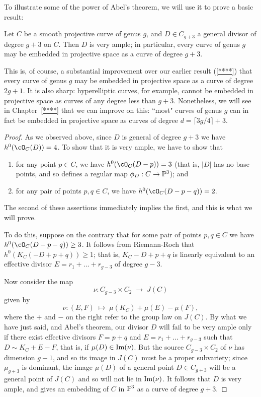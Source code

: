 To illustrate some of the power of Abel's theorem, we will use it to prove a basic result:

\begin{theorem}\label{g+3 theorem}
Let $C$ be a smooth projective curve of genus $g$, and $D \in C_{g+3}$ a general divisor of degree $g+3$ on $C$. Then $D$ is very ample; in particular, every curve of genus $g$ may be embedded in projective space as a curve of degree $g+3$.
\end{theorem}

This is, of course, a substantial improvement over our earlier result (\ref{****}) that every curve of genus $g$ may be embedded in projective space as a curve of degree $2g+1$. It is also sharp: hyperelliptic curves, for example, cannot be embedded in projective space as curves of any degree less than $g+3$. Nonetheless, we will see in Chapter~\ref{****} that we can improve on this: ``most" curves of genus $g$ can in fact be embedded in projective space as curves of degree $d = \lceil 3g/4 \rceil + 3$.

\begin{proof}
As we observed above, since $D$ is general of degree $g+3$ we have $h^0(\cO_C(D)) = 4$. To show that it is very ample, we have to show that
\begin{enumerate}
\item for any point $p \in C$, we have $h^0(\cO_C(D-p)) = 3$ (that is, $|D|$ has no base points, and so defines a regular map $\phi_D : C \to \PP^3$); and
\item for any pair of points $p, q \in C$, we have $h^0(\cO_C(D-p-q)) = 2$.
\end{enumerate}
The second of these assertions immediately implies the first, and this is what we will prove.

To do this, suppose on the contrary that for some pair of points $p, q \in C$ we have $h^0(\cO_C(D-p-q)) \geq 3$. It follows from Riemann-Roch that $h^0(K_C(-D + p + q)) \geq 1$; that is, $K_C -D + p + q$ is linearly equivalent to an effective divisor $E = r_1 + \dots + r_{g-3}$ of degree $g-3$.

Now consider the map
$$
\nu : C_{g-3} \times C_2 \; \to \; J(C)
$$
given by
$$
\nu : (E,F) \; \mapsto \; \mu(K_C) + \mu(E) - \mu(F),
$$
where the $+$ and $-$ on the right refer to the group law on $J(C)$. By what we have just said, and Abel's theorem, our divisor $D$ will fail to be very ample only if there exist effective divisors $F = p+q$ and $E = r_1+\dots+r_{g-3}$ such that $D \sim K_C +E-F$, that is, if
$\mu(D) \in {\rm Im}(\nu)$. But the source $C_{g-3} \times C_2$ of $\nu$ has dimension $g-1$, and so its image in $J(C)$ must be a proper subvariety; since $\mu_{g+3}$ is dominant, the image $\mu(D)$ of a general point $D \in C_{g+3}$ will be a general point of $J(C)$ and so will not lie in ${\rm Im}(\nu)$. It follows that $D$ is very ample, and gives an embedding of $C$ in $\PP^3$ as a curve of degree $g+3$.
\end{proof}

